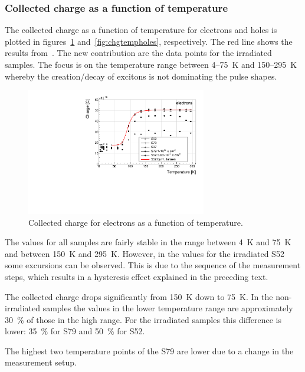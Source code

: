 \subsubsection{Collected charge as a function of temperature}
\label{subsec:qvst}
 The collected charge as a function of temperature for electrons and holes is plotted in figures~\ref{fig:chgtempelecs} and~\ref{fig:chgtempholes}, respectively. The red line shows the results from~\cite{Jansen:1956431}. The new contribution are the data points for the irradiated samples. The focus is on the temperature range between 4--75~K and 150--295~K whereby the creation/decay of excitons is not dominating the pulse shapes.
\begin{figure}[!t]
\centering
\includegraphics[width=0.70\textwidth]{../scripts/03_experimental_results/plots/charge500V} 
\caption{Collected charge for electrons as a function of temperature.}
\label{fig:chgtempelecs}
\end{figure}
The values for all samples are fairly stable in the range between 4~K and 75~K and between 150~K and 295~K. However, in the values for the irradiated S52 some excursions can be observed. This is due to the sequence of the measurement steps, which results in a hysteresis effect explained in the preceding text.

The collected charge drops significantly from 150~K down to 75~K. In the non-irradiated samples the values in the lower temperature range are approximately 30~\% of those in the high range. For the irradiated samples this difference is lower: 35~\% for S79 and 50~\% for S52.

The highest two temperature points of the S79 are lower due to a change in the measurement setup.

